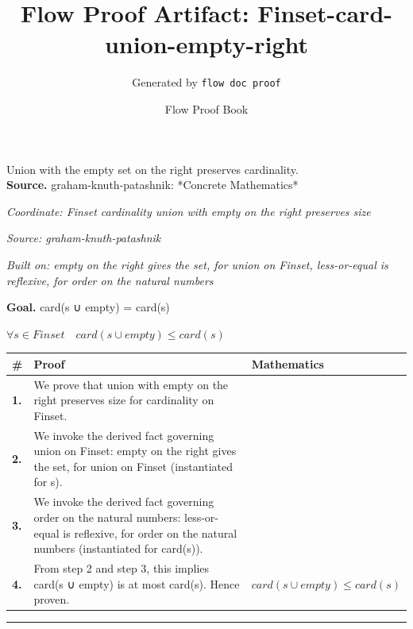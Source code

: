 \documentclass[11pt]{article}
\title{Flow Proof Artifact: Finset-card-union-empty-right}
\author{Generated by \texttt{flow doc proof}}
\date{Flow Proof Book}
\theoremstyle{definition}
\begin{document}
\maketitle
Union with the empty set on the right preserves cardinality.\\[0.5em]
\textbf{Source.} graham-knuth-patashnik: *Concrete Mathematics*\\[0.5em]
\bigskip
{}\par
\smallskip\noindent\textit{Coordinate: Finset \cdot cardinality \cdot union with empty on the right preserves size}\par
\smallskip\noindent\textit{Source: graham-knuth-patashnik}\par
\smallskip\noindent\textit{Built on: empty on the right gives the set, for union on Finset, less-or-equal is reflexive, for order on the natural numbers}\par
\medskip
\noindent\textbf{Goal.} card(s ∪ empty) = card(s)\par
\noindent$\displaystyle \forall s \in Finset\quad card(s ∪ empty) \le card(s)$\par
\medskip
\noindent
\begin{tabular}{@{} >{\raggedright\arraybackslash}p{} >{\raggedright\arraybackslash}p{} >{\raggedleft\arraybackslash}p{} @{}}
\textbf{\#} & \textbf{Proof} & \textbf{Mathematics} \\
\midrule
\textbf{1.} & We prove that union with empty on the right preserves size for cardinality on Finset. & \\[0.45em]
\textbf{2.} & We invoke the derived fact governing union on Finset: empty on the right gives the set, for union on Finset (instantiated for s). & \\[0.45em]
\textbf{3.} & We invoke the derived fact governing order on the natural numbers: less-or-equal is reflexive, for order on the natural numbers (instantiated for card(s)). & \\[0.45em]
\textbf{4.} & From step 2 and step 3, this implies card(s ∪ empty) is at most card(s). Hence proven. & $\displaystyle card(s ∪ empty) \le card(s)$ \\[0.45em]
\bottomrule
\end{tabular}
\label{thm:Finset-cardinality-union_with_empty_on_the_right_preserves_size}
\par\medskip\hrule
\end{document}
